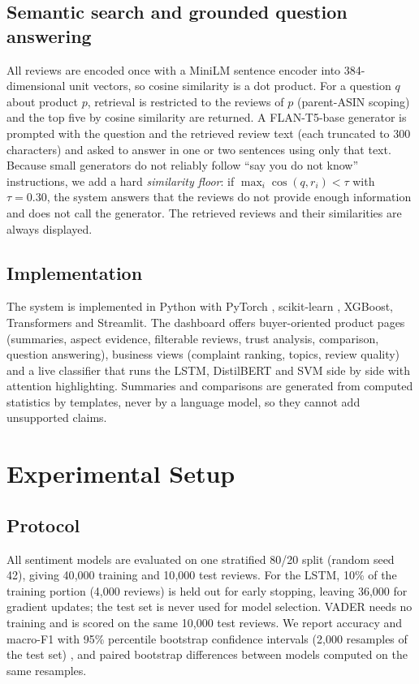 \documentclass[conference]{IEEEtran}
\begin{document}
\subsection{Semantic search and grounded question answering}
All reviews are encoded once with a MiniLM sentence encoder \cite{wang2020minilm,reimers2019sbert} into 384-dimensional unit vectors, so cosine similarity is a dot product. For a question $q$ about product $p$, retrieval is restricted to the reviews of $p$ (parent-ASIN scoping) and the top five by cosine similarity are returned. A FLAN-T5-base generator \cite{chung2022flan} is prompted with the question and the retrieved review text (each truncated to 300 characters) and asked to answer in one or two sentences using only that text. Because small generators do not reliably follow ``say you do not know'' instructions, we add a hard \emph{similarity floor}: if $\max_i\cos(q,r_i)<\tau$ with $\tau=0.30$, the system answers that the reviews do not provide enough information and does not call the generator. The retrieved reviews and their similarities are always displayed.

\subsection{Implementation}
The system is implemented in Python with PyTorch \cite{paszke2019pytorch}, scikit-learn \cite{pedregosa2011sklearn}, XGBoost, Transformers \cite{wolf2020transformers} and Streamlit. The dashboard offers buyer-oriented product pages (summaries, aspect evidence, filterable reviews, trust analysis, comparison, question answering), business views (complaint ranking, topics, review quality) and a live classifier that runs the LSTM, DistilBERT and SVM side by side with attention highlighting. Summaries and comparisons are generated from computed statistics by templates, never by a language model, so they cannot add unsupported claims.

\section{Experimental Setup}
\subsection{Protocol}
All sentiment models are evaluated on one stratified 80/20 split (random seed 42), giving 40{,}000 training and 10{,}000 test reviews. For the LSTM, 10\% of the training portion (4{,}000 reviews) is held out for early stopping, leaving 36{,}000 for gradient updates; the test set is never used for model selection. VADER needs no training and is scored on the same 10{,}000 test reviews. We report accuracy and macro-F1 with 95\% percentile bootstrap confidence intervals (2{,}000 resamples of the test set) \cite{efron1993bootstrap}, and paired bootstrap differences between models computed on the same resamples.
\end{document}
